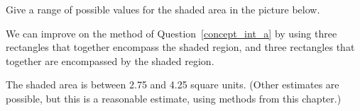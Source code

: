 \begin{Mquestion}
Give a range of possible values for the shaded area in the picture below.
\begin{center}
\end{center}
\end{Mquestion}
\begin{hint}
We can improve on the method of Question~\ref{concept_int_a} by using three rectangles that together encompass the shaded region, and three rectangles that together are encompassed by the shaded region.
\end{hint}
\begin{answer}
The shaded area is between 2.75 and 4.25 square units. (Other estimates are possible, but this is a reasonable estimate, using methods from this chapter.)
\end{answer}
